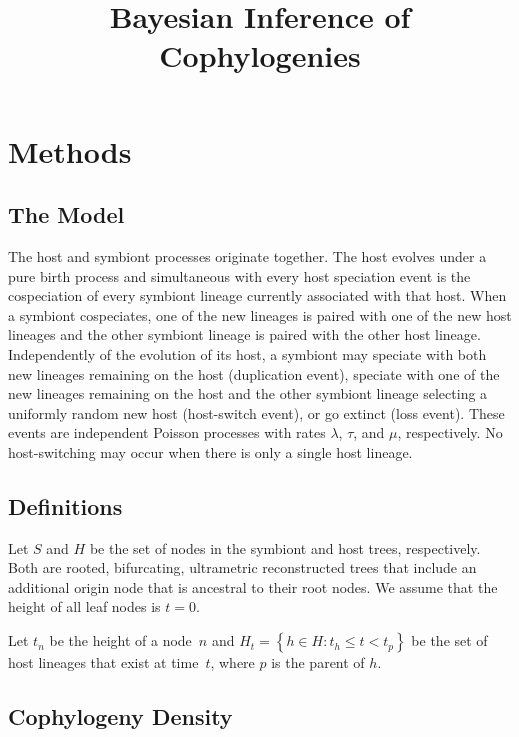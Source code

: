 \documentclass{article}
\title{Bayesian Inference of Cophylogenies}
\begin{document}
    \section*{Methods}

        \subsection*{The Model}

            The host and symbiont processes originate together. The host
            evolves under a pure birth process and simultaneous with every host
            speciation event is the cospeciation of every symbiont lineage
            currently associated with that host. When a symbiont cospeciates,
            one of the new lineages is paired with one of the new host lineages
            and the other symbiont lineage is paired with the other host
            lineage. Independently of the evolution of its host, a symbiont may
            speciate with both new lineages remaining on the host (duplication
            event), speciate with one of the new lineages remaining on the host
            and the other symbiont lineage selecting a uniformly random new
            host (host-switch event), or go extinct (loss event). These events
            are independent Poisson processes with rates $\lambda$, $\tau$, and
            $\mu$, respectively. No host-switching may occur when there is only
            a single host lineage.

        \subsection*{Definitions}

            Let $S$ and $H$ be the set of nodes in the symbiont and host trees,
            respectively. Both are rooted, bifurcating, ultrametric
            reconstructed trees that include an additional origin node that is
            ancestral to their root nodes. We assume that the height of all
            leaf nodes is $t = 0$.

            Let $t_n$ be the height of a node~$n$ and $H_t = \left\{h \in H:
            t_h \leq t < t_p\right\}$ be the set of host lineages that exist
            at time~$t$, where $p$ is the parent of $h$.

        \subsection*{Cophylogeny Density}
\end{document}
